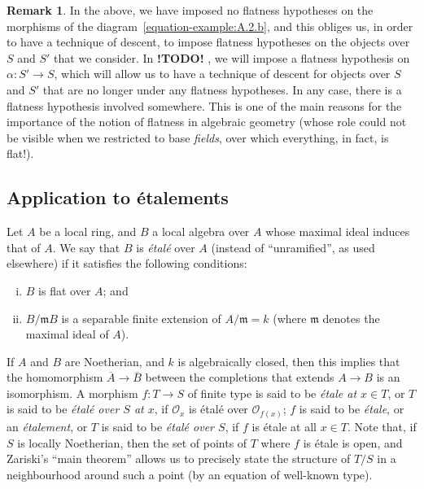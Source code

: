 \documentclass{article}
\theoremstyle{plain}
\theoremstyle{definition}
\newtheorem*{remark}{Remark}
\newcommand{\sh}[1]{{\mathscr{#1}}}
\newcommand{\fk}[1]{{\mathfrak{#1}}}
\newcommand{\todo}{\textbf{ !TODO! }}
\newcommand{\oldpage}[1]{\marginpar{\footnotesize$\Big\vert$ \textit{p.~#1}}}
\begin{document}
\begin{remark}
  In the above, we have imposed no flatness hypotheses on the morphisms of the diagram~\cref{equation-example:A.2.b}, and this obliges us, in order to have a technique of descent, to impose flatness hypotheses on the objects over $S$ and $S'$ that we consider.
  In \todo, we will impose a flatness hypothesis on $\alpha\colon S'\to S$, which will allow us to have a technique of descent for objects over $S$ and $S'$ that are no longer under any flatness hypotheses.
  In any case, there is a flatness hypothesis involved somewhere.
  This is one of the main reasons for the importance of the notion of flatness in algebraic geometry (whose role could not be visible when we restricted to base \emph{fields}, over which everything, in fact, is flat!).
\end{remark}


\oldpage{190-10}
\subsection{Application to \'{e}talements}
\label{A.3}

Let $A$ be a local ring, and $B$ a local algebra over $A$ whose maximal ideal induces that of $A$.
We say that $B$ is \emph{\'{e}tal\'{e}} over $A$ (instead of ``unramified'', as used elsewhere) if it satisfies the following conditions:
\begin{enumerate}[(i)]
  \item $B$ is flat over $A$; and
  \item $B/\fk{m}B$ is a separable finite extension of $A/\fk{m}=k$ (where $\fk{m}$ denotes the maximal ideal of $A$).
\end{enumerate}
If $A$ and $B$ are Noetherian, and $k$ is algebraically closed, then this implies that the homomorphism $\overline{A}\to\overline{B}$ between the completions that extends $A\to B$ is an isomorphism.
A morphism $f\colon T\to S$ of finite type is said to be \emph{\'{e}tale at $x\in T$}, or $T$ is said to be \emph{\'{e}tal\'{e} over $S$ at $x$}, if $\sh{O}_x$ is \'{e}tal\'{e} over $\sh{O}_{f(x)}$;
$f$ is said to be \emph{\'{e}tale}, or an \emph{\'{e}talement}, or $T$ is said to be \emph{\'{e}tal\'{e} over $S$}, if $f$ is \'{e}tale at all $x\in T$.
Note that, if $S$ is locally Noetherian, then the set of points of $T$ where $f$ is \'{e}tale is open, and Zariski's ``main theorem'' allows us to precisely state the structure of $T/S$ in a neighbourhood around such a point (by an equation of well-known type).
\end{document}
